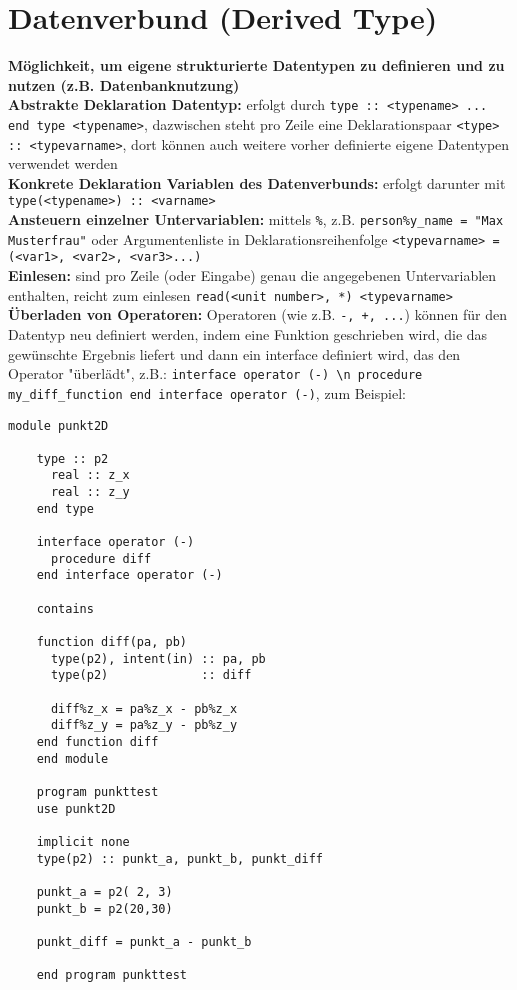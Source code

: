 \documentclass[a4paper, twocolumn]{scrarticle}
\begin{document}
\section{Datenverbund (Derived Type)}\label{sec:datenverbund}
\textbf{Möglichkeit, um eigene strukturierte Datentypen zu definieren und zu nutzen (z.B. Datenbanknutzung)}\\
\textbf{Abstrakte Deklaration Datentyp:} erfolgt durch \lstinline|type :: <typename> ... end type <typename>|, dazwischen steht pro Zeile eine Deklarationspaar \lstinline|<type> :: <typevarname>|, dort können auch weitere vorher definierte eigene Datentypen verwendet werden\\
\textbf{Konkrete Deklaration Variablen des Datenverbunds:} erfolgt darunter mit \lstinline|type(<typename>) :: <varname>|\\
\textbf{Ansteuern einzelner Untervariablen:} mittels \lstinline|%|, z.B. \lstinline|person%y_name = "Max Musterfrau"| oder Argumentenliste in Deklarationsreihenfolge \lstinline|<typevarname> = (<var1>, <var2>, <var3>...)|\\
\textbf{Einlesen:} sind pro Zeile (oder Eingabe) genau die angegebenen Untervariablen enthalten, reicht zum einlesen \lstinline|read(<unit number>, *) <typevarname>|\\
\textbf{Überladen von Operatoren:} Operatoren (wie z.B. \lstinline|-, +, ...|) können für den Datentyp neu definiert werden, indem eine Funktion geschrieben wird, die das gewünschte Ergebnis liefert und dann ein interface definiert wird, das den Operator "überlädt", z.B.: \lstinline|interface operator (-) \n procedure my_diff_function end interface operator (-)|, zum Beispiel:
\begin{lstlisting}[caption={Nutzung eigener Datentypen inklusive Überladung}]
	module punkt2D
	
	type :: p2
	  real :: z_x
	  real :: z_y
	end type
	
	interface operator (-)
	  procedure diff
	end interface operator (-)
	
	contains
	
	function diff(pa, pb)
	  type(p2), intent(in) :: pa, pb
	  type(p2)             :: diff
	  
	  diff%z_x = pa%z_x - pb%z_x
	  diff%z_y = pa%z_y - pb%z_y
	end function diff
	end module
	
	program punkttest
	use punkt2D
	
	implicit none
	type(p2) :: punkt_a, punkt_b, punkt_diff
	
	punkt_a = p2( 2, 3)
	punkt_b = p2(20,30)
	
	punkt_diff = punkt_a - punkt_b
	
	end program punkttest
\end{lstlisting}
\end{document}
